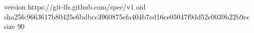 version https://git-lfs.github.com/spec/v1
oid sha256:9663617b80425e6bdbcc3960875efa404b7ed16ce05047f9dd52e0039b22b9ec
size 90
